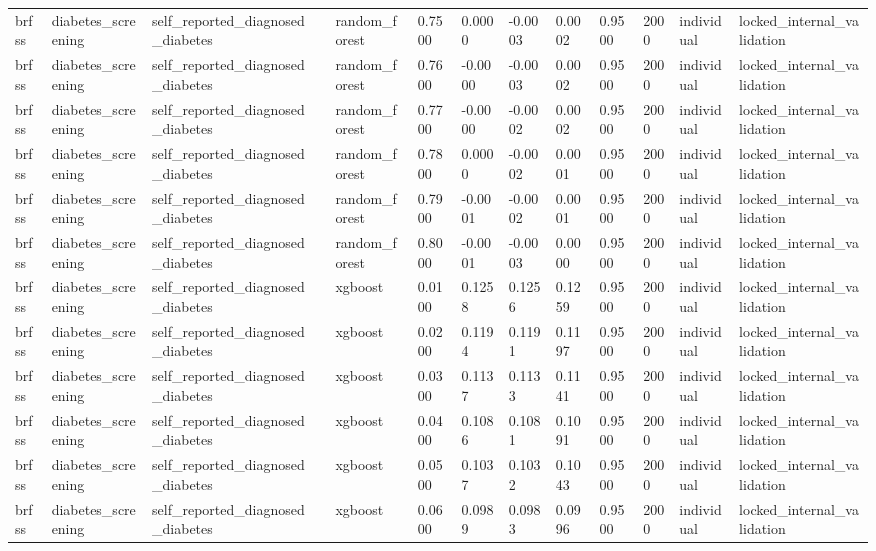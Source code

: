 \begin{tabular}{lllllllllllll}
brfss & diabetes\_screening & self\_reported\_diagnosed\_diabetes &  & random\_forest & 0.7500 & 0.0000 & -0.0003 & 0.0002 & 0.9500 & 2000 & individual & locked\_internal\_validation \\
brfss & diabetes\_screening & self\_reported\_diagnosed\_diabetes &  & random\_forest & 0.7600 & -0.0000 & -0.0003 & 0.0002 & 0.9500 & 2000 & individual & locked\_internal\_validation \\
brfss & diabetes\_screening & self\_reported\_diagnosed\_diabetes &  & random\_forest & 0.7700 & -0.0000 & -0.0002 & 0.0002 & 0.9500 & 2000 & individual & locked\_internal\_validation \\
brfss & diabetes\_screening & self\_reported\_diagnosed\_diabetes &  & random\_forest & 0.7800 & 0.0000 & -0.0002 & 0.0001 & 0.9500 & 2000 & individual & locked\_internal\_validation \\
brfss & diabetes\_screening & self\_reported\_diagnosed\_diabetes &  & random\_forest & 0.7900 & -0.0001 & -0.0002 & 0.0001 & 0.9500 & 2000 & individual & locked\_internal\_validation \\
brfss & diabetes\_screening & self\_reported\_diagnosed\_diabetes &  & random\_forest & 0.8000 & -0.0001 & -0.0003 & 0.0000 & 0.9500 & 2000 & individual & locked\_internal\_validation \\
brfss & diabetes\_screening & self\_reported\_diagnosed\_diabetes &  & xgboost & 0.0100 & 0.1258 & 0.1256 & 0.1259 & 0.9500 & 2000 & individual & locked\_internal\_validation \\
brfss & diabetes\_screening & self\_reported\_diagnosed\_diabetes &  & xgboost & 0.0200 & 0.1194 & 0.1191 & 0.1197 & 0.9500 & 2000 & individual & locked\_internal\_validation \\
brfss & diabetes\_screening & self\_reported\_diagnosed\_diabetes &  & xgboost & 0.0300 & 0.1137 & 0.1133 & 0.1141 & 0.9500 & 2000 & individual & locked\_internal\_validation \\
brfss & diabetes\_screening & self\_reported\_diagnosed\_diabetes &  & xgboost & 0.0400 & 0.1086 & 0.1081 & 0.1091 & 0.9500 & 2000 & individual & locked\_internal\_validation \\
brfss & diabetes\_screening & self\_reported\_diagnosed\_diabetes &  & xgboost & 0.0500 & 0.1037 & 0.1032 & 0.1043 & 0.9500 & 2000 & individual & locked\_internal\_validation \\
brfss & diabetes\_screening & self\_reported\_diagnosed\_diabetes &  & xgboost & 0.0600 & 0.0989 & 0.0983 & 0.0996 & 0.9500 & 2000 & individual & locked\_internal\_validation \\

\end{tabular}
